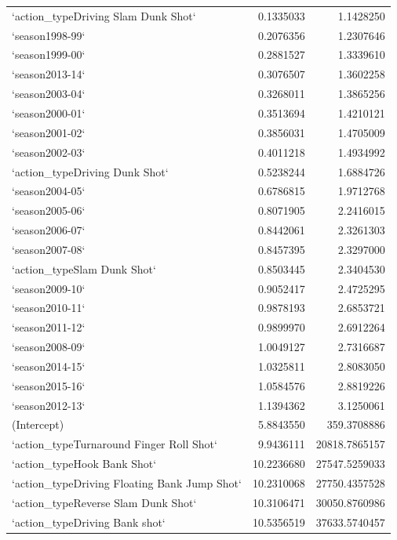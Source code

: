 \documentclass[american,]{article}
\begin{document}
\begin{tabular}{lrr}
`action\_typeDriving Slam Dunk Shot` & 0.1335033 & 1.1428250\\
`season1998-99` & 0.2076356 & 1.2307646\\
`season1999-00` & 0.2881527 & 1.3339610\\
`season2013-14` & 0.3076507 & 1.3602258\\
\addlinespace
`season2003-04` & 0.3268011 & 1.3865256\\
`season2000-01` & 0.3513694 & 1.4210121\\
`season2001-02` & 0.3856031 & 1.4705009\\
`season2002-03` & 0.4011218 & 1.4934992\\
`action\_typeDriving Dunk Shot` & 0.5238244 & 1.6884726\\
\addlinespace
`season2004-05` & 0.6786815 & 1.9712768\\
`season2005-06` & 0.8071905 & 2.2416015\\
`season2006-07` & 0.8442061 & 2.3261303\\
`season2007-08` & 0.8457395 & 2.3297000\\
`action\_typeSlam Dunk Shot` & 0.8503445 & 2.3404530\\
\addlinespace
`season2009-10` & 0.9052417 & 2.4725295\\
`season2010-11` & 0.9878193 & 2.6853721\\
`season2011-12` & 0.9899970 & 2.6912264\\
`season2008-09` & 1.0049127 & 2.7316687\\
`season2014-15` & 1.0325811 & 2.8083050\\
\addlinespace
`season2015-16` & 1.0584576 & 2.8819226\\
`season2012-13` & 1.1394362 & 3.1250061\\
(Intercept) & 5.8843550 & 359.3708886\\
`action\_typeTurnaround Finger Roll Shot` & 9.9436111 & 20818.7865157\\
`action\_typeHook Bank Shot` & 10.2236680 & 27547.5259033\\
\addlinespace
`action\_typeDriving Floating Bank Jump Shot` & 10.2310068 & 27750.4357528\\
`action\_typeReverse Slam Dunk Shot` & 10.3106471 & 30050.8760986\\
`action\_typeDriving Bank shot` & 10.5356519 & 37633.5740457\\
\bottomrule
\end{tabular}


\end{document}
